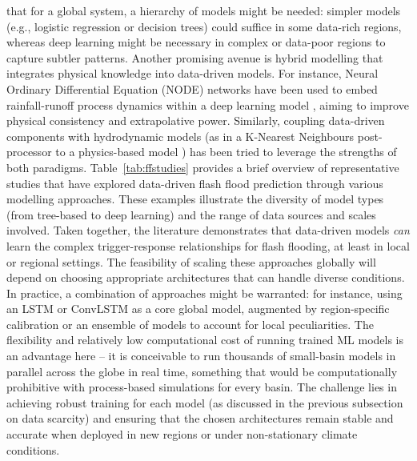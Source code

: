 that for a global system, a hierarchy of models might be needed: simpler models (e.g., logistic regression or decision trees) could suffice in some data-rich regions, whereas deep learning might be necessary in complex or data-poor regions to capture subtler patterns. Another promising avenue is hybrid modelling that integrates physical knowledge into data-driven models. For instance, Neural Ordinary Differential Equation (NODE) networks have been used to embed rainfall-runoff process dynamics within a deep learning model \citep{Alkaabi2025}, aiming to improve physical consistency and extrapolative power. Similarly, coupling data-driven components with hydrodynamic models (as in a K-Nearest Neighbours post-processor to a physics-based model \citep{Zhou2023}) has been tried to leverage the strengths of both paradigms. Table~\ref{tab:ffstudies} provides a brief overview of representative studies that have explored data-driven flash flood prediction through various modelling approaches. These examples illustrate the diversity of model types (from tree-based to deep learning) and the range of data sources and scales involved. Taken together, the literature demonstrates that data-driven models \textit{can} learn the complex trigger-response relationships for flash flooding, at least in local or regional settings. The feasibility of scaling these approaches globally will depend on choosing appropriate architectures that can handle diverse conditions. In practice, a combination of approaches might be warranted: for instance, using an LSTM or ConvLSTM as a core global model, augmented by region-specific calibration or an ensemble of models to account for local peculiarities. The flexibility and relatively low computational cost of running trained ML models is an advantage here – it is conceivable to run thousands of small-basin models in parallel across the globe in real time, something that would be computationally prohibitive with process-based simulations for every basin. The challenge lies in achieving robust training for each model (as discussed in the previous subsection on data scarcity) and ensuring that the chosen architectures remain stable and accurate when deployed in new regions or under non-stationary climate conditions. 

